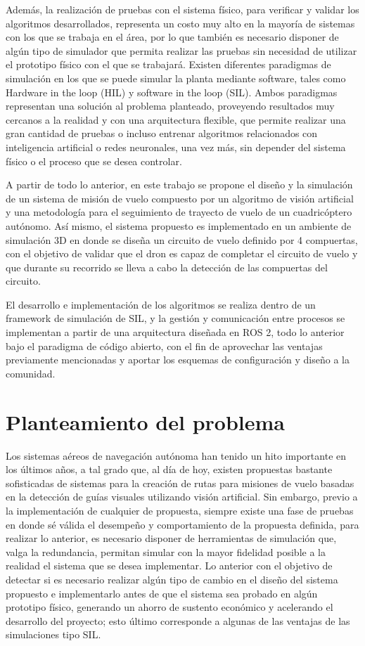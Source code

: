 Además, la realización de pruebas con el sistema físico, para verificar y validar los algoritmos desarrollados, representa un costo muy alto en la mayoría de sistemas con los que se trabaja en el área, por lo que también es necesario disponer de algún tipo de simulador que permita realizar las pruebas sin necesidad de utilizar el prototipo físico con el que se trabajará. Existen diferentes paradigmas de simulación en los que se puede simular la planta mediante software, tales como Hardware in the loop (HIL) y software in the loop (SIL). Ambos paradigmas representan una solución al problema planteado, proveyendo resultados muy cercanos a la realidad y con una arquitectura flexible, que permite realizar una gran cantidad de pruebas o incluso entrenar algoritmos relacionados con inteligencia artificial o redes neuronales, una vez más, sin depender del sistema físico o el proceso que se desea controlar. 

A partir de todo lo anterior, en este trabajo se propone el diseño y la simulación de un sistema de misión de vuelo compuesto por un algoritmo de visión artificial y una metodología para el seguimiento de trayecto de vuelo de un cuadricóptero autónomo. Así mismo, el sistema propuesto es implementado en un ambiente de simulación 3D en donde se diseña un circuito de vuelo definido por 4 compuertas, con el objetivo de validar que el dron es capaz de completar el circuito de vuelo y que durante su recorrido se lleva a cabo la detección de las compuertas del circuito. 

El desarrollo e implementación de los algoritmos se realiza dentro de un framework de simulación de SIL, y la gestión y comunicación entre procesos se implementan a partir de una arquitectura diseñada en ROS 2, todo lo anterior bajo el paradigma de código abierto, con el fin de aprovechar las ventajas previamente mencionadas y aportar los esquemas de configuración y diseño a la comunidad.


\section{Planteamiento del problema}
Los sistemas aéreos de navegación autónoma han tenido un hito importante en los últimos años, a tal grado que, al día de hoy, existen propuestas bastante sofisticadas de sistemas para la creación de rutas para misiones de vuelo basadas en la detección de guías visuales utilizando visión artificial. Sin embargo, previo a la implementación de cualquier de propuesta, siempre existe una fase de pruebas en donde sé válida el desempeño y comportamiento de la propuesta definida, para realizar lo anterior, es necesario disponer de herramientas de simulación que, valga la redundancia, permitan simular con la mayor fidelidad posible a la realidad el sistema que se desea implementar. Lo anterior con el objetivo de detectar si es necesario realizar algún tipo de cambio en el diseño del sistema propuesto e implementarlo antes de que el sistema sea probado en algún prototipo físico, generando un ahorro de sustento económico y acelerando el desarrollo del proyecto; esto último corresponde a algunas de las ventajas de las simulaciones tipo SIL. 

